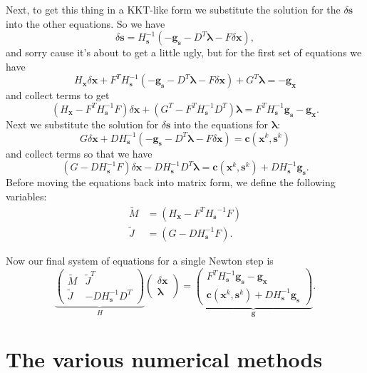 \documentclass[letterpaper,12pt]{article}
\theoremstyle{remark}
\newcommand{\x}{\mathbf{x}}
\newcommand{\C}{\mathbf{c}}
\newcommand{\s}{\mathbf{s}}
\newcommand{\la}{\mathbf{\lambda}}
\newcommand{\dx}{\delta \x}
\newcommand{\ds}{\delta \s}
\newcommand{\Hx}{ {H_\x} }
\newcommand{\Hs}{ {H_\s} }
\newcommand{\Hsinv}{H_\s^{-1}}
\newcommand{\gx}{ {\mathbf{g}_\x} }
\newcommand{\gs}{ {\mathbf{g}_\s} }
\begin{document}
Next, to get this thing in a KKT-like form we substitute the solution for the $\ds$ into the other equations. So we have
\begin{equation}
\ds = \Hsinv \left(-\gs - D^T \la - F\dx \right),
\end{equation}
and sorry cause it's about to get a little ugly, but for the first set of equations we have
\begin{equation*}
\Hx\dx + F^T\Hsinv \left(-\gs - D^T\la - F\dx \right) +G^T \la = -\gx
\end{equation*}
and collect terms to get
\begin{equation}
\left(\Hx - F^T\Hsinv F \right)\dx + (G^T - F^T\Hsinv D^T)\la = 
F^T\Hsinv \gs -\gx.
\end{equation}
Next we substitute the solution for $\ds$ into the equations for $\la$:
\begin{equation*}
G\dx + D\Hsinv \left(-\gs - D^T\la - F\dx\right) = \C (\x^k, \s^k)
\end{equation*}
and collect terms so that we have
\begin{equation}
(G - D\Hsinv F)\dx - D\Hsinv D^T\la = \C (\x^k, \s^k) + D\Hsinv\gs.
\end{equation}
Before moving the equations back into matrix form, we define the following variables:
\begin{align}
\tilde{M} &= (\Hx - F^T\Hs^{-1}F) \\
\tilde{J} &= (G - D\Hsinv F). 
\end{align}

Now our final system of equations for a single Newton step is
\begin{equation}
\underbrace{
\begin{pmatrix}
\tilde{M} & \tilde{J}^T \\
\tilde{J} & -D\Hsinv D^T 
\end{pmatrix}
}_H
\begin{pmatrix}
\dx \\
\la
\end{pmatrix} =
\underbrace{
\begin{pmatrix}
F^T\Hsinv\gs -\gx \\
\C (\x^k, \s^k) + D\Hsinv\gs
\end{pmatrix}
}_\mathbf{g} .
\end{equation}

\section{The various numerical methods}
\end{document}

